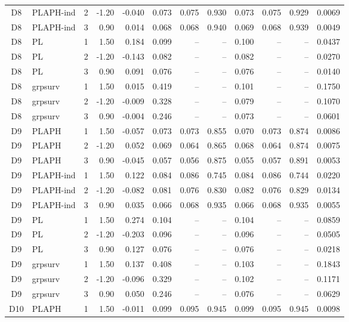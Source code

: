 \begin{longtable}{cllrrrrrrrrr}
D8 & PLAPH-ind & 2 & -1.20 & -0.040 & 0.073 & 0.075 & 0.930 & 0.073 & 0.075 & 0.929 & 0.0069 \\
D8 & PLAPH-ind & 3 & 0.90 & 0.014 & 0.068 & 0.068 & 0.940 & 0.069 & 0.068 & 0.939 & 0.0049 \\
D8 & PL & 1 & 1.50 & 0.184 & 0.099 & -- & -- & 0.100 & -- & -- & 0.0437 \\
D8 & PL & 2 & -1.20 & -0.143 & 0.082 & -- & -- & 0.082 & -- & -- & 0.0270 \\
D8 & PL & 3 & 0.90 & 0.091 & 0.076 & -- & -- & 0.076 & -- & -- & 0.0140 \\
D8 & grpsurv & 1 & 1.50 & 0.015 & 0.419 & -- & -- & 0.101 & -- & -- & 0.1750 \\
D8 & grpsurv & 2 & -1.20 & -0.009 & 0.328 & -- & -- & 0.079 & -- & -- & 0.1070 \\
D8 & grpsurv & 3 & 0.90 & -0.004 & 0.246 & -- & -- & 0.073 & -- & -- & 0.0601 \\
D9 & PLAPH & 1 & 1.50 & -0.057 & 0.073 & 0.073 & 0.855 & 0.070 & 0.073 & 0.874 & 0.0086 \\
D9 & PLAPH & 2 & -1.20 & 0.052 & 0.069 & 0.064 & 0.865 & 0.068 & 0.064 & 0.874 & 0.0075 \\
D9 & PLAPH & 3 & 0.90 & -0.045 & 0.057 & 0.056 & 0.875 & 0.055 & 0.057 & 0.891 & 0.0053 \\
D9 & PLAPH-ind & 1 & 1.50 & 0.122 & 0.084 & 0.086 & 0.745 & 0.084 & 0.086 & 0.744 & 0.0220 \\
D9 & PLAPH-ind & 2 & -1.20 & -0.082 & 0.081 & 0.076 & 0.830 & 0.082 & 0.076 & 0.829 & 0.0134 \\
D9 & PLAPH-ind & 3 & 0.90 & 0.035 & 0.066 & 0.068 & 0.935 & 0.066 & 0.068 & 0.935 & 0.0055 \\
D9 & PL & 1 & 1.50 & 0.274 & 0.104 & -- & -- & 0.104 & -- & -- & 0.0859 \\
D9 & PL & 2 & -1.20 & -0.203 & 0.096 & -- & -- & 0.096 & -- & -- & 0.0505 \\
D9 & PL & 3 & 0.90 & 0.127 & 0.076 & -- & -- & 0.076 & -- & -- & 0.0218 \\
D9 & grpsurv & 1 & 1.50 & 0.137 & 0.408 & -- & -- & 0.103 & -- & -- & 0.1843 \\
D9 & grpsurv & 2 & -1.20 & -0.096 & 0.329 & -- & -- & 0.102 & -- & -- & 0.1171 \\
D9 & grpsurv & 3 & 0.90 & 0.050 & 0.246 & -- & -- & 0.076 & -- & -- & 0.0629 \\
D10 & PLAPH & 1 & 1.50 & -0.011 & 0.099 & 0.095 & 0.945 & 0.099 & 0.095 & 0.945 & 0.0098 \\

\end{longtable}
